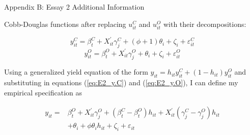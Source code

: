 \documentclass[aspectratio=169]{beamer}
\newenvironment{wideitemize}{\itemize\addtolength{\itemsep}{10pt}}{\enditemize}
\begin{document}
\begin{frame}{Appendix B: Essay 2 Additional Information}
    \begin{wideitemize}
        \item Cobb-Douglas functions after replacing $u^{C}_{it}$ and $u^{O}_{it}$ with their decompositions:

    \begin{equation} \label{eq:E2_y.C}
    y^{C}_{it} = \beta^{C}_{t} + X^{\prime}_{it}\gamma^{C}_{j} + (\phi + 1)\theta_{i} + \zeta_i + \varepsilon^{C}_{it}
    \end{equation}
    \begin{equation} \label{eq:E2_y.O}
    y^{O}_{it} = \beta^{O}_{t} + X^{\prime}_{it}\gamma^{O}_{j} + \theta_{i} + \zeta_i + \varepsilon^{O}_{it}
    \end{equation}
    
        \item Using a generalized yield equation of the form $y_{it} = h_{it}y^{C}_{it} + (1-h_{it})y^{O}_{it}$ and substituting in equations (\ref{eq:E2_y.C}) and (\ref{eq:E2_y.O}), I can define my empirical specification as

\begin{equation} \label{eq:E2_spec}
    \begin{split}
    y_{it} = & \beta^{O}_{t} + X^{\prime}_{it}\gamma^{O}_{j} + (\beta^{C}_{t} - \beta^{O}_{t})h_{it} +  X^{\prime}_{it}(\gamma^{C}_{j} - \gamma^{O}_{j})h_{it} \\
    & + \theta_{i} + \phi\theta_{i}h_{it} + \zeta_i + \varepsilon_{it}
    \end{split}
\end{equation}

\end{wideitemize}
\end{frame}
\end{document}

